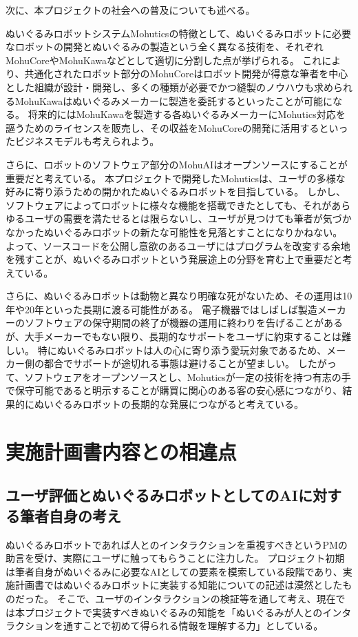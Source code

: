 \documentclass[uplatex,a4paper,12pt]{jsarticle}
\begin{document}
次に、本プロジェクトの社会への普及についても述べる。

ぬいぐるみロボットシステムMohuticsの特徴として、ぬいぐるみロボットに必要なロボットの開発とぬいぐるみの製造という全く異なる技術を、それぞれMohuCoreやMohuKawaなどとして適切に分割した点が挙げられる。
これにより、共通化されたロボット部分のMohuCoreはロボット開発が得意な筆者を中心とした組織が設計・開発し、多くの種類が必要でかつ縫製のノウハウも求められるMohuKawaはぬいぐるみメーカーに製造を委託するといったことが可能になる。
将来的にはMohuKawaを製造する各ぬいぐるみメーカーにMohutics対応を謳うためのライセンスを販売し、その収益をMohuCoreの開発に活用するといったビジネスモデルも考えられよう。

さらに、ロボットのソフトウェア部分のMohuAIはオープンソースにすることが重要だと考えている。
本プロジェクトで開発したMohuticsは、ユーザの多様な好みに寄り添うための開かれたぬいぐるみロボットを目指している。
しかし、ソフトウェアによってロボットに様々な機能を搭載できたとしても、それがあらゆるユーザの需要を満たせるとは限らないし、ユーザが見つけても筆者が気づかなかったぬいぐるみロボットの新たな可能性を見落とすことになりかねない。
よって、ソースコードを公開し意欲のあるユーザにはプログラムを改変する余地を残すことが、ぬいぐるみロボットという発展途上の分野を育む上で重要だと考えている。

さらに、ぬいぐるみロボットは動物と異なり明確な死がないため、その運用は10年や20年といった長期に渡る可能性がある。
電子機器ではしばしば製造メーカーのソフトウェアの保守期間の終了が機器の運用に終わりを告げることがあるが、大手メーカーでもない限り、長期的なサポートをユーザに約束することは難しい。
特にぬいぐるみロボットは人の心に寄り添う愛玩対象であるため、メーカー側の都合でサポートが途切れる事態は避けることが望ましい。
したがって、ソフトウェアをオープンソースとし、Mohuticsが一定の技術を持つ有志の手で保守可能であると明示することが購買に関心のある客の安心感につながり、結果的にぬいぐるみロボットの長期的な発展につながると考えている。


\section{実施計画書内容との相違点}
\subsection{ユーザ評価とぬいぐるみロボットとしてのAIに対する筆者自身の考え}
ぬいぐるみロボットであれば人とのインタラクションを重視すべきというPMの助言を受け、実際にユーザに触ってもらうことに注力した。
プロジェクト初期は筆者自身がぬいぐるみに必要なAIとしての要素を模索している段階であり、実施計画書ではぬいぐるみロボットに実装する知能についての記述は漠然としたものだった。
そこで、ユーザのインタラクションの検証等を通して考え、現在では本プロジェクトで実装すべきぬいぐるみの知能を「ぬいぐるみが人とのインタラクションを通すことで初めて得られる情報を理解する力」としている。
\end{document}
